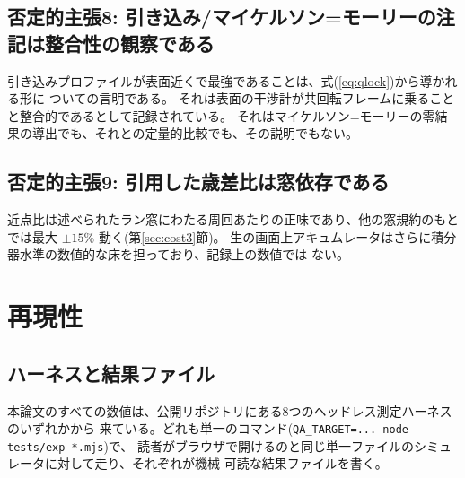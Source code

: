 \documentclass[a4paper,10pt,twocolumn]{ltjsarticle}
\begin{document}
\subsection{否定的主張8: 引き込み/マイケルソン=モーリーの注記は整合性の観察である}
引き込みプロファイルが表面近くで最強であることは、式(\ref{eq:qlock})から導かれる形に
ついての言明である。
それは表面の干渉計が共回転フレームに乗ることと整合的であるとして記録されている。
それはマイケルソン=モーリーの零結果の導出でも、それとの定量的比較でも、その説明でもない。

\subsection{否定的主張9: 引用した歳差比は窓依存である}
近点比は述べられたラン窓にわたる周回あたりの正味であり、他の窓規約のもとでは最大
$\pm15\%$ 動く(第\ref{sec:cost3}節)。
生の画面上アキュムレータはさらに積分器水準の数値的な床を担っており、記録上の数値では
ない。

\section{再現性}
\label{sec:repro}

\subsection{ハーネスと結果ファイル}
\label{sec:harnesses}

本論文のすべての数値は、公開リポジトリにある8つのヘッドレス測定ハーネスのいずれかから
来ている。どれも単一のコマンド(\texttt{QA\_TARGET=... node tests/exp-*.mjs})で、
読者がブラウザで開けるのと同じ単一ファイルのシミュレータに対して走り、それぞれが機械
可読な結果ファイルを書く。
\end{document}
